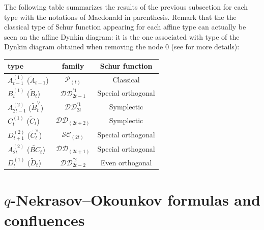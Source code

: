 \documentclass[11pt,letterpaper]{amsart}
\def\ccsc{\mathcal {SC}}
\def\ccdd{\mathcal {DD}}
\def\ccp{\mathcal P}
\numberwithin{equation}{section}
\numberwithin{df}{section}
\begin{document}
\medskip
The following table summarizes the results of the previous subsection for each type with the notations of Macdonald \cite{Mac} in parenthesis. Remark that the the classical type of Schur function appearing for each affine type can actually be seen on the affine Dynkin diagram: it is the one associated with type of the Dynkin diagram obtained when removing the node $0$ (see \cite{LW} for more details):
\begin{center}
\begin{tabular}{|l|c|c|}
\hline
type & family & Schur function \\
\hline
\rule{0pt}{15pt}$A^{(1)}_{t-1}$ ($\tilde{A}_{t-1}$) &  $\ccp_{(t)}$ &  Classical\\
\hline
\rule{0pt}{15pt}$B^{(1)}_{t}$ ($\tilde{B}_t$) &  $\ccdd^{'1}_{2t-1}$ &  Special orthogonal\\
\hline
\rule{0pt}{15pt}$A^{(2)}_{2t-1}$ ($\tilde{B}_t^{\vee}$) &  $\ccdd^{'1}_{2t}$ &  Symplectic \\
\hline
\rule{0pt}{15pt}$C^{(1)}_{t}$ ($\tilde{C}_t$)&  $\ccdd_{(2t+2)}$ &  Symplectic\\
\hline
\rule{0pt}{15pt}$D^{(2)}_{t+1}$ ($\tilde{C}_{t}^{\vee}$)&  $\ccsc_{(2t)}$ &  Special orthogonal\\
\hline
\rule{0pt}{15pt}$A^{(2)}_{2t}$ ($\tilde{BC}_{t}$)&  $\ccdd_{(2t+1)}$ &  Special orthogonal\\
\hline
\rule{0pt}{15pt}$D^{(1)}_{t}$ ($\tilde{D}_{t}$)&  $\ccdd^{'2}_{2t-2}$ &  Even orthogonal\\
\hline

\end{tabular}
\label{tableau}

\end{center}



\section{$q$-Nekrasov--Okounkov formulas and confluences}\label{sec:NO}
\end{document}
